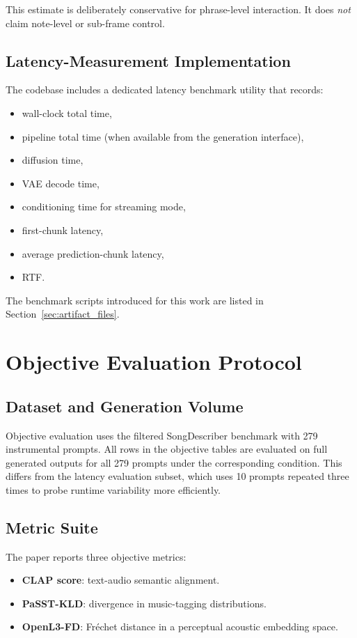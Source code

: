 \documentclass[11pt]{article}
\begin{document}
This estimate is deliberately conservative for phrase-level interaction. It does \emph{not} claim note-level or sub-frame control.

\subsection{Latency-Measurement Implementation}

The codebase includes a dedicated latency benchmark utility that records:
\begin{itemize}
    \item wall-clock total time,
    \item pipeline total time (when available from the generation interface),
    \item diffusion time,
    \item VAE decode time,
    \item conditioning time for streaming mode,
    \item first-chunk latency,
    \item average prediction-chunk latency,
    \item RTF.
\end{itemize}

The benchmark scripts introduced for this work are listed in Section~\ref{sec:artifact_files}.

\section{Objective Evaluation Protocol}

\subsection{Dataset and Generation Volume}

Objective evaluation uses the filtered SongDescriber benchmark with 279 instrumental prompts. All rows in the objective tables are evaluated on full generated outputs for all 279 prompts under the corresponding condition. This differs from the latency evaluation subset, which uses 10 prompts repeated three times to probe runtime variability more efficiently.

\subsection{Metric Suite}

The paper reports three objective metrics:
\begin{itemize}
    \item \textbf{CLAP score}: text-audio semantic alignment.
    \item \textbf{PaSST-KLD}: divergence in music-tagging distributions.
    \item \textbf{OpenL3-FD}: Fr\'echet distance in a perceptual acoustic embedding space.
\end{itemize}
\end{document}
